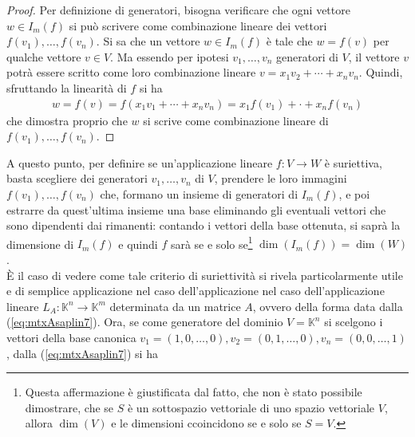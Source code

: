 \documentclass{book}
\theoremstyle{definition}
\theoremstyle{plain}
\begin{document}
\begin{proof}
  Per definizione di generatori, bisogna verificare che ogni vettore
  $w\in I_m(f)$ si può scrivere come combinazione lineare dei vettori
  $f(v_1),\dots,f(v_n)$. Si sa che un vettore $w\in I_m(f)$ è tale che
  $w=f(v)$ per qualche vettore $v\in V.$ Ma essendo per ipotesi $v_1,
  \dots,v_n$ generatori di $V$, il vettore $v$ potrà essere scritto come
  loro combinazione lineare $v=x_1v_2+\cdots+x_nv_n$. Quindi, sfruttando
  la linearità di $f$ si ha
  \begin{eqnarray*}
    w=f(v)=f(x_1v_1+\cdots+x_nv_n)=x_1f(v_1)+\cdot+x_nf(v_n)
  \end{eqnarray*}
  che dimostra proprio che $w$ si scrive come combinazione lineare di
  $f(v_1),\dots,f(v_n)$.
\end{proof}
A questo punto, per definire se un'applicazione lineare $f:V\to W$ è
suriettiva, basta scegliere dei generatori $v_1,\dots,v_n$ di $V$,
prendere le loro immagini $f(v_1),\dots,f(v_n)$ che, formano un insieme
di generatori di $I_m(f)$, e poi estrarre da quest'ultima insieme una
base eliminando gli eventuali vettori che sono dipendenti dai rimanenti:
contando i vettori della base ottenuta, si saprà la dimensione di
$I_m(f)$ e quindi $f$ sarà se e solo se\footnote{Questa affermazione è
  giustificata dal fatto, che non è stato possibile dimostrare, che se
  $S$ è un sottospazio vettoriale di uno spazio vettoriale $V$, allora
  $\dim (V)$ e le dimensioni ccoincidono se e solo se $S=V$.}
$\dim(I_m(f))=\dim(W)$.\\
È il caso di vedere come tale criterio di suriettività si rivela
particolarmente utile e di semplice applicazione nel caso
dell'applicazione nel caso dell'applicazione lineare $L_A:\mathds{K}^n
\to \mathds{K}^m$ determinata da un matrice $A$, ovvero della forma data
dalla (\ref{eq:mtxAsaplin7}). Ora, se come generatore del dominio
$V=\mathds{K}^n$ si scelgono i vettori della base canonica $v_1=
(1,0,\dots,0),v_2=(0,1,\dots,0),v_n=(0,0,\dots,1)$, dalla
(\ref{eq:mtxAsaplin7}) si ha
\end{document}
